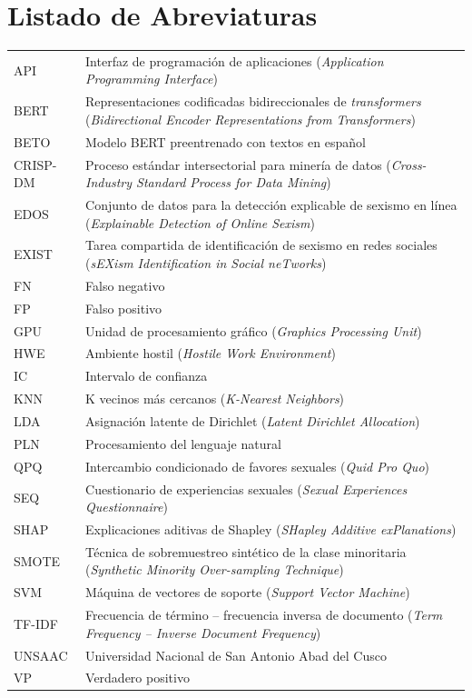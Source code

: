 \chapter*{Listado de Abreviaturas}

\begin{singlespace}
\renewcommand{\arraystretch}{1.3}
\begin{longtable}{@{}L{2.8cm} L{12.6cm}@{}}
API & Interfaz de programación de aplicaciones (\textit{Application Programming Interface}) \\
BERT & Representaciones codificadas bidireccionales de \textit{transformers} (\textit{Bidirectional Encoder Representations from Transformers}) \\
BETO & Modelo BERT preentrenado con textos en español \\
CRISP-DM & Proceso estándar intersectorial para minería de datos (\textit{Cross-Industry Standard Process for Data Mining}) \\
EDOS & Conjunto de datos para la detección explicable de sexismo en línea (\textit{Explainable Detection of Online Sexism}) \\
EXIST & Tarea compartida de identificación de sexismo en redes sociales (\textit{sEXism Identification in Social neTworks}) \\
FN & Falso negativo \\
FP & Falso positivo \\
GPU & Unidad de procesamiento gráfico (\textit{Graphics Processing Unit}) \\
HWE & Ambiente hostil (\textit{Hostile Work Environment}) \\
IC & Intervalo de confianza \\
KNN & K vecinos más cercanos (\textit{K-Nearest Neighbors}) \\
LDA & Asignación latente de Dirichlet (\textit{Latent Dirichlet Allocation}) \\
PLN & Procesamiento del lenguaje natural \\
QPQ & Intercambio condicionado de favores sexuales (\textit{Quid Pro Quo}) \\
SEQ & Cuestionario de experiencias sexuales (\textit{Sexual Experiences Questionnaire}) \\
SHAP & Explicaciones aditivas de Shapley (\textit{SHapley Additive exPlanations}) \\
SMOTE & Técnica de sobremuestreo sintético de la clase minoritaria (\textit{Synthetic Minority Over-sampling Technique}) \\
SVM & Máquina de vectores de soporte (\textit{Support Vector Machine}) \\
TF-IDF & Frecuencia de término -- frecuencia inversa de documento (\textit{Term Frequency -- Inverse Document Frequency}) \\
UNSAAC & Universidad Nacional de San Antonio Abad del Cusco \\
VP & Verdadero positivo \\
\end{longtable}
\end{singlespace}
\setcounter{table}{0}
